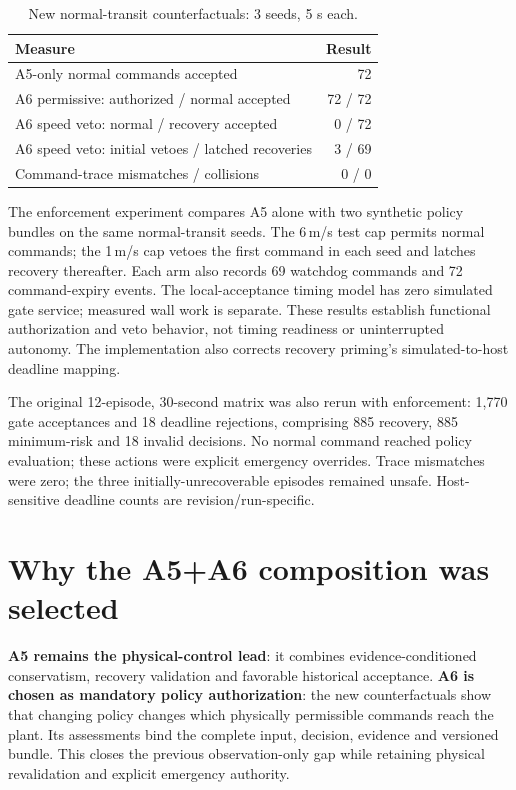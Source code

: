 \documentclass[sigconf,nonacm]{acmart}
\begin{document}
\begin{table}[t]
\centering
\caption{New normal-transit counterfactuals: 3 seeds, 5 s each.}
\label{tab:a6}
\scriptsize
\begin{tabularx}{\columnwidth}{@{}Xr@{}}
\toprule
Measure & Result\\
\midrule
A5-only normal commands accepted & 72\\
A6 permissive: authorized / normal accepted & 72 / 72\\
A6 speed veto: normal / recovery accepted & 0 / 72\\
A6 speed veto: initial vetoes / latched recoveries & 3 / 69\\
Command-trace mismatches / collisions & 0 / 0\\
\bottomrule
\end{tabularx}
\end{table}

The enforcement experiment compares A5 alone with two synthetic policy bundles on the same normal-transit seeds. The 6\,m/s test cap permits normal commands; the 1\,m/s cap vetoes the first command in each seed and latches recovery thereafter. Each arm also records 69 watchdog commands and 72 command-expiry events. The local-acceptance timing model has zero simulated gate service; measured wall work is separate. These results establish functional authorization and veto behavior, not timing readiness or uninterrupted autonomy. The implementation also corrects recovery priming's simulated-to-host deadline mapping.

The original 12-episode, 30-second matrix was also rerun with enforcement: 1,770 gate acceptances and 18 deadline rejections, comprising 885 recovery, 885 minimum-risk and 18 invalid decisions. No normal command reached policy evaluation; these actions were explicit emergency overrides. Trace mismatches were zero; the three initially-unrecoverable episodes remained unsafe. Host-sensitive deadline counts are revision/run-specific.

\section{Why the A5+A6 composition was selected}
\textbf{A5 remains the physical-control lead}: it combines evidence-conditioned conservatism, recovery validation and favorable historical acceptance. \textbf{A6 is chosen as mandatory policy authorization}: the new counterfactuals show that changing policy changes which physically permissible commands reach the plant. Its assessments bind the complete input, decision, evidence and versioned bundle. This closes the previous observation-only gap while retaining physical revalidation and explicit emergency authority.
\end{document}
